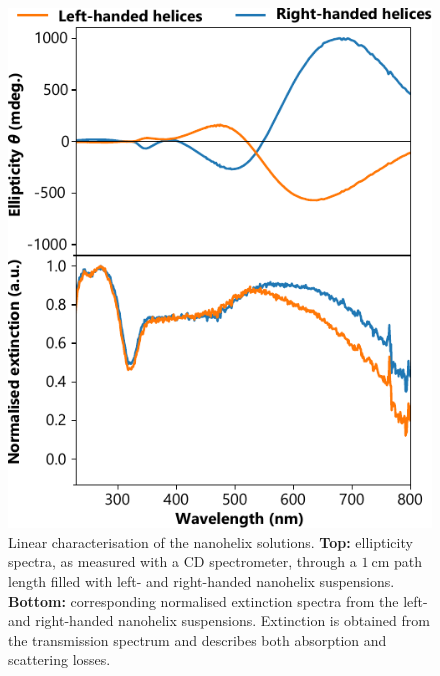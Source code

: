 \begin{figure}[htb!]	
    \centering	
    \includegraphics[scale=1]{./figures/results/HRS/linear_data.pdf}
    \caption{\label{fig:results:HRS:linear_data}
    Linear characterisation of the nanohelix solutions. \textbf{Top:} ellipticity spectra, as measured with a CD spectrometer, through a $\SI{1}{\centi\m}$ path length filled with left- and right-handed nanohelix suspensions. \textbf{Bottom:} corresponding normalised extinction spectra from the left- and right-handed nanohelix suspensions. Extinction is obtained from the transmission spectrum and describes both absorption and scattering losses.}	
\end{figure}

